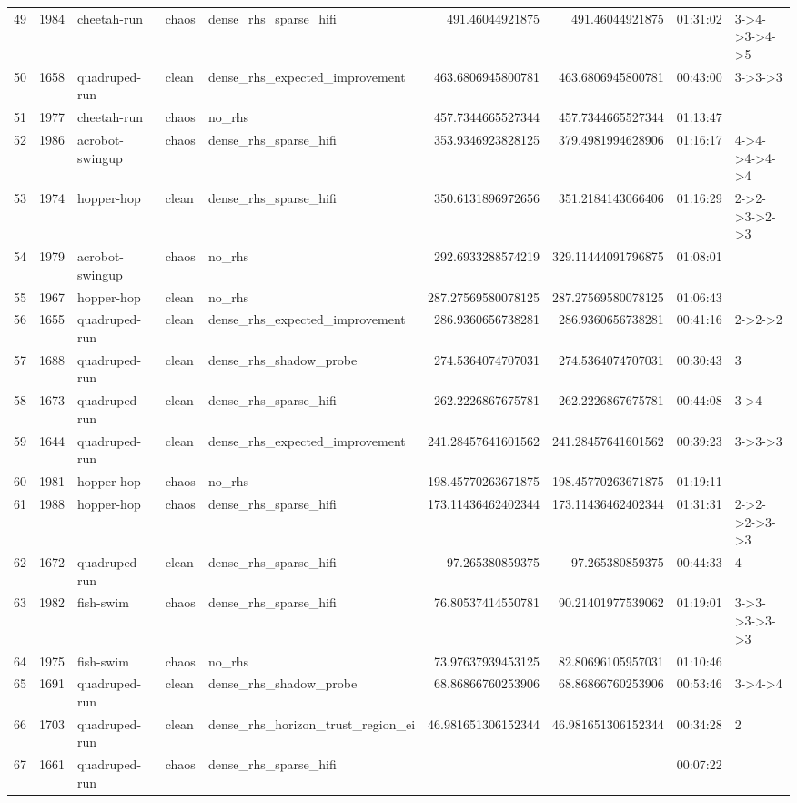 \begin{tabular}{rllllrrll}
49 & 1984 & cheetah-run & chaos & dense\_rhs\_sparse\_hifi & 491.46044921875 & 491.46044921875 & 01:31:02 & 3->4->3->4->5 \\
50 & 1658 & quadruped-run & clean & dense\_rhs\_expected\_improvement & 463.6806945800781 & 463.6806945800781 & 00:43:00 & 3->3->3 \\
51 & 1977 & cheetah-run & chaos & no\_rhs & 457.7344665527344 & 457.7344665527344 & 01:13:47 &  \\
52 & 1986 & acrobot-swingup & chaos & dense\_rhs\_sparse\_hifi & 353.9346923828125 & 379.4981994628906 & 01:16:17 & 4->4->4->4->4 \\
53 & 1974 & hopper-hop & clean & dense\_rhs\_sparse\_hifi & 350.6131896972656 & 351.2184143066406 & 01:16:29 & 2->2->3->2->3 \\
54 & 1979 & acrobot-swingup & chaos & no\_rhs & 292.6933288574219 & 329.11444091796875 & 01:08:01 &  \\
55 & 1967 & hopper-hop & clean & no\_rhs & 287.27569580078125 & 287.27569580078125 & 01:06:43 &  \\
56 & 1655 & quadruped-run & clean & dense\_rhs\_expected\_improvement & 286.9360656738281 & 286.9360656738281 & 00:41:16 & 2->2->2 \\
57 & 1688 & quadruped-run & clean & dense\_rhs\_shadow\_probe & 274.5364074707031 & 274.5364074707031 & 00:30:43 & 3 \\
58 & 1673 & quadruped-run & clean & dense\_rhs\_sparse\_hifi & 262.2226867675781 & 262.2226867675781 & 00:44:08 & 3->4 \\
59 & 1644 & quadruped-run & clean & dense\_rhs\_expected\_improvement & 241.28457641601562 & 241.28457641601562 & 00:39:23 & 3->3->3 \\
60 & 1981 & hopper-hop & chaos & no\_rhs & 198.45770263671875 & 198.45770263671875 & 01:19:11 &  \\
61 & 1988 & hopper-hop & chaos & dense\_rhs\_sparse\_hifi & 173.11436462402344 & 173.11436462402344 & 01:31:31 & 2->2->2->3->3 \\
62 & 1672 & quadruped-run & clean & dense\_rhs\_sparse\_hifi & 97.265380859375 & 97.265380859375 & 00:44:33 & 4 \\
63 & 1982 & fish-swim & chaos & dense\_rhs\_sparse\_hifi & 76.80537414550781 & 90.21401977539062 & 01:19:01 & 3->3->3->3->3 \\
64 & 1975 & fish-swim & chaos & no\_rhs & 73.97637939453125 & 82.80696105957031 & 01:10:46 &  \\
65 & 1691 & quadruped-run & clean & dense\_rhs\_shadow\_probe & 68.86866760253906 & 68.86866760253906 & 00:53:46 & 3->4->4 \\
66 & 1703 & quadruped-run & clean & dense\_rhs\_horizon\_trust\_region\_ei & 46.981651306152344 & 46.981651306152344 & 00:34:28 & 2 \\
67 & 1661 & quadruped-run & chaos & dense\_rhs\_sparse\_hifi &  &  & 00:07:22 &  \\
\bottomrule
\end{tabular}
